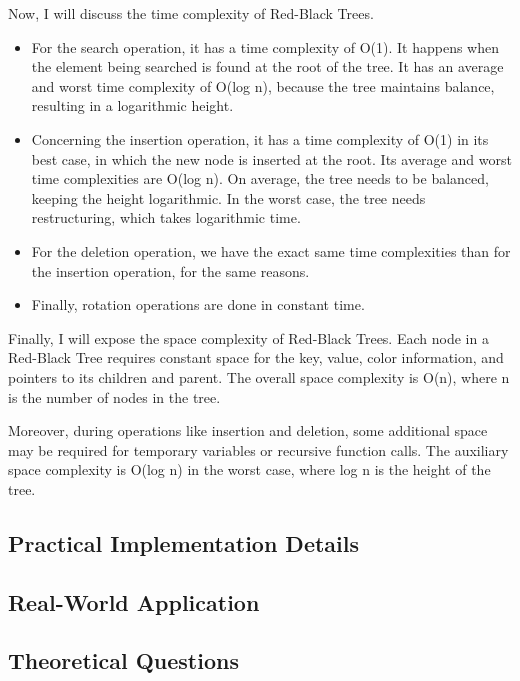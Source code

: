 \documentclass[12pt]{amsart}
\begin{document}
    Now, I will discuss the time complexity of Red-Black Trees.
    
    \begin{itemize}
    	\item For the search operation, it has a time complexity of O(1). It happens when the element being searched is found at the root of the tree.
    	It has an average and worst time complexity of O(log n), because the tree maintains balance, resulting in a logarithmic height.
    	
    	\item Concerning the insertion operation, it has a time complexity of O(1) in its best case, in which the new node is inserted at the root.
    	Its average and worst time complexities are O(log n). On average, the tree needs to be balanced, keeping the height logarithmic.
    	In the worst case, the tree needs restructuring, which takes logarithmic time.
    	
    	\item For the deletion operation, we have the exact same time complexities than for the insertion operation, for the same reasons.
    	
    	\item Finally, rotation operations are done in constant time.
    \end{itemize}
    
    Finally, I will expose the space complexity of Red-Black Trees.
    Each node in a Red-Black Tree requires constant space for the key, value, color information, and pointers to its children and parent. The overall space complexity is O(n), where n is the number of nodes in the tree.
    
    Moreover, during operations like insertion and deletion, some additional space may be required for temporary variables or recursive function calls.
    The auxiliary space complexity is O(log n) in the worst case, where log n is the height of the tree.
\subsection{Practical Implementation Details}

\subsection{Real-World Application}

\subsection{Theoretical Questions}
\end{document}
